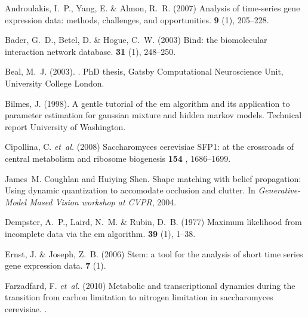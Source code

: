 \documentclass{bioinfo}
\begin{document}
\begin{thebibliography}{}

Androulakis, I.~P., Yang, E.  \& Almon, R.~R. (2007{\em{}}) Analysis of
  time-series gene expression data: methods, challenges, and opportunities.
 {\bf 9} (1),
  205--228.

Bader, G.~D., Betel, D.  \& Hogue, C.~W. (2003{\em{}}) Bind: the biomolecular
  interaction network database.
 {\bf 31} (1), 248--250.

Beal, M.~J. (2003{\em{}}).
.
\newblock PhD thesis, Gatsby Computational Neuroscience Unit, University
  College London.

Bilmes, J. (1998{\em{}}).
\newblock A gentle tutorial of the em algorithm and its application to
  parameter estimation for gaussian mixture and hidden markov models.
\newblock Technical report University of Washington.

Cipollina, C. {\em et~al.}  (2008{\em{}}) Saccharomyces cerevisiae SFP1: at the crossroads of central metabolism and ribosome biogenesis
 {\bf 154} , 1686--1699.

James~M. Coughlan and Huiying Shen.
\newblock Shape matching with belief propagation: Using dynamic quantization to
  accomodate occlusion and clutter.
\newblock In {\em Generative-Model Mased Vision workshop at CVPR}, 2004.

Dempster, A.~P., Laird, N.~M.  \& Rubin, D.~B. (1977{\em{}}) Maximum likelihood
  from incomplete data via the em algorithm.
 {\bf 39} (1), 1--38.

Ernst, J. \& Joseph, Z.~B. (2006{\em{}}) Stem: a tool for the analysis of short
  time series gene expression data.
 {\bf 7} (1).

Farzadfard, F. {\em et~al.} (2010{\em{}})
  Metabolic and transcriptional dynamics during the transition from carbon
  limitation to nitrogen limitation in saccharomyces cerevisiae.
.


\end{thebibliography}
\end{document}
